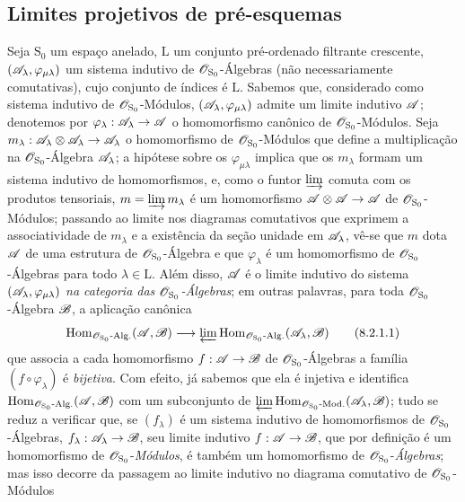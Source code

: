 \subsection{Limites projetivos de pré-esquemas}
\label{subsection:IV.8.2}

\begin{env}[8.2.1]
\label{IV.8.2.1}
Seja $\mathrm{S}_0$ um espaço anelado, $\mathrm{L}$ um conjunto pré-ordenado filtrante crescente, $(\mathscr{A}_\lambda,\varphi_{\mu\lambda})$ um sistema indutivo de $\mathscr{O}_{\mathrm{S}_0}$-Álgebras (não necessariamente comutativas), cujo conjunto de índices é $\mathrm{L}$.
Sabemos que, considerado como sistema indutivo de $\mathscr{O}_{\mathrm{S}_0}$-Módulos, $(\mathscr{A}_\lambda,\varphi_{\mu\lambda})$ admite um limite indutivo $\mathscr{A}$; denotemos por $\varphi_\lambda:\sh{A}_\lambda\to\sh{A}$ o homomorfismo canônico de $\mathscr{O}_{\mathrm{S}_0}$-Módulos.
Seja $m_\lambda:\sh{A}_\lambda\otimes\sh{A}_\lambda\to\sh{A}_\lambda$ o homomorfismo de $\mathscr{O}_{\mathrm{S}_0}$-Módulos que define a multiplicação na $\mathscr{O}_{\mathrm{S}_0}$-Álgebra $\mathscr{A}_\lambda$; a hipótese sobre os $\varphi_{\mu\lambda}$ implica que os $m_\lambda$ formam um sistema indutivo de homomorfismos,
e, como o funtor $\varinjlim$ comuta com os produtos tensoriais, $m=\varinjlim m_\lambda$ é um homomorfismo $\sh{A}\otimes\sh{A}\to\sh{A}$ de $\mathscr{O}_{\mathrm{S}_0}$-Módulos; passando ao limite nos diagramas comutativos que exprimem a associatividade de $m_\lambda$ e a existência da seção unidade em $\mathscr{A}_\lambda$, vê-se que $m$ dota $\mathscr{A}$ de uma estrutura de $\mathscr{O}_{\mathrm{S}_0}$-Álgebra e que $\varphi_\lambda$ é um homomorfismo de $\mathscr{O}_{\mathrm{S}_0}$-Álgebras para todo $\lambda\in\mathrm{L}$.
Além disso, $\mathscr{A}$ é o limite indutivo do sistema $(\mathscr{A}_\lambda,\varphi_{\mu\lambda})$ \emph{na categoria das $\mathscr{O}_{\mathrm{S}_0}$-Álgebras}; em outras palavras, para toda $\mathscr{O}_{\mathrm{S}_0}$-Álgebra $\mathscr{B}$, a aplicação canônica
\begin{equation}
  \operatorname{Hom}_{\sh{O}_{\mathrm{S}_0}\text{-}\mathrm{Alg.}}(\sh{A},\sh{B})\to\varprojlim\operatorname{Hom}_{\sh{O}_{\mathrm{S}_0}\text{-}\mathrm{Alg.}}(\sh{A}_\lambda,\sh{B})
  \tag{8.2.1.1}
\label{IV.8.2.1.1}
\end{equation}
que associa a cada homomorfismo $f:\sh{A}\to\sh{B}$ de $\mathscr{O}_{\mathrm{S}_0}$-Álgebras a família $(f\circ\varphi_\lambda)$ é \emph{bijetiva}.
Com efeito, já sabemos que ela é injetiva e identifica $\operatorname{Hom}_{\mathscr{O}_{\mathrm{S}_0}\text{-}\mathrm{Alg.}}(\mathscr{A},\mathscr{B})$ com um subconjunto de $\varprojlim\operatorname{Hom}_{\mathscr{O}_{\mathrm{S}_0}\text{-}\mathrm{Mod.}}(\mathscr{A}_\lambda,\mathscr{B})$; tudo se reduz a verificar que, se $(f_\lambda)$ é um sistema indutivo de homomorfismos de $\mathscr{O}_{\mathrm{S}_0}$-Álgebras, $f_\lambda:\sh{A}_\lambda\to\sh{B}$, seu limite indutivo $f:\sh{A}\to\sh{B}$, que por definição é um homomorfismo de $\mathscr{O}_{\mathrm{S}_0}$-\emph{Módulos}, é também um homomorfismo de $\mathscr{O}_{\mathrm{S}_0}$-\emph{Álgebras}; mas isso decorre da passagem ao limite indutivo no diagrama comutativo de $\mathscr{O}_{\mathrm{S}_0}$-Módulos

\end{env}
